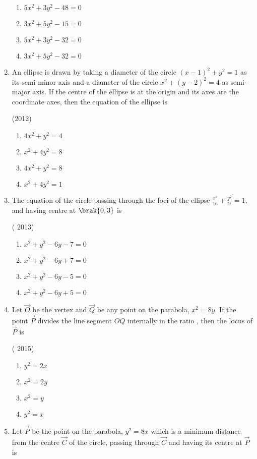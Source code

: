 \begin{enumerate}[label=\thesubsection.\arabic*.,ref=\thesubsection.\theenumi]
	\begin{multicols}{2}
\begin{enumerate}
    \item $5x^2+3y^2-48=0$
    \item $3x^2+5y^2-15=0$
    \item $5x^2+3y^2-32=0$
    \item $3x^2+5y^2-32=0$
\end{enumerate}\end{multicols}
\item An ellipse is drawn by taking a diameter of the circle $(x-1)^2+y^2=1$ as its semi minor axis and a diameter of the circle $x^2+(y-2)^2=4$ as semi-major axis. If the centre of the ellipse is at the origin and its axes are the coordinate axes, then the equation of the ellipse is 

\hfill(2012)
		\begin{multicols}{2}
\begin{enumerate}
    \item $4x^2+y^2=4$ 
    \item $x^2+4y^2=8$
    \item $4x^2+y^2=8$
    \item $x^2+4y^2=1$
\end{enumerate}\end{multicols}
\item The equation of the circle passing through the foci of the ellipse $\frac{x^2}{16}+\frac{y^2}{9}=1$, and having centre at $\brak{0,3}$ is

\hfill( 2013)
			\begin{multicols}{2}
\begin{enumerate}
    \item $x^2+y^2-6y-7=0$
    \item $x^2+y^2-6y+7=0$
    \item $x^2+y^2-6y-5=0$
    \item $x^2+y^2-6y+5=0$
\end{enumerate}\end{multicols}
\item Let $\vec{O}$ be the vertex and $\vec{Q}$ be any point on the parabola, $x^2=8y$. If the point $\vec{P}$ divides the line segment $OQ$ internally in the ratio , then the locus of $\vec{P}$ is

\hfill( 2015)
				\begin{multicols}{4}
\begin{enumerate}
    \item $y^2=2x$
    \item $x^2=2y$
    \item $x^2=y$
    \item $y^2=x$
\end{enumerate}\end{multicols}
\item Let $\vec{P}$ be the point on the parabola, $y^2=8x$ which is a minimum distance from the centre $\vec{C}$ of the circle, passing through $\vec{C}$ and having its centre at $\vec{P}$ is


\end{enumerate}
